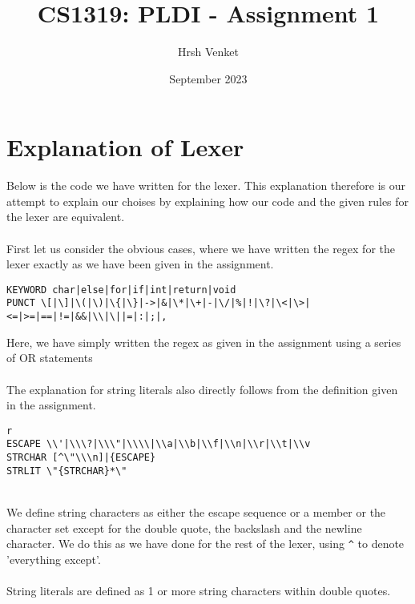 \documentclass{article}
\title{CS1319: PLDI - Assignment 1}
\author{Hrsh Venket}
\date{September 2023}
\begin{document}
\maketitle 


\section*{Explanation of Lexer}
Below is the code we have written for the lexer. This explanation therefore is our attempt to explain our choises by explaining how our code and the given rules for the lexer are equivalent.\\
\\
First let us consider the obvious cases, where we have written the regex for the lexer exactly as we have been given in the assignment.
\begin{verbatim}
KEYWORD char|else|for|if|int|return|void
PUNCT \[|\]|\(|\)|\{|\}|->|&|\*|\+|-|\/|%|!|\?|\<|\>|<=|>=|==|!=|&&|\\|\||=|:|;|,
\end{verbatim}
Here, we have simply written the regex as given in the assignment using a series of OR statements\\
\\
The explanation for string literals also directly follows from the definition given in the assignment.
\begin{verbatim}r
ESCAPE \\'|\\\?|\\\"|\\\\|\\a|\\b|\\f|\\n|\\r|\\t|\\v
STRCHAR [^\"\\\n]|{ESCAPE}
STRLIT \"{STRCHAR}*\"
\end{verbatim}\\
We define string characters as either the escape sequence or a member or the character set except for the double quote, the backslash and the newline character. We do this as we have done for the rest of the lexer, using \verb|^| to denote 'everything except'.\\
\\
String literals are defined as 1 or more string characters within double quotes.\\
\end{document}
